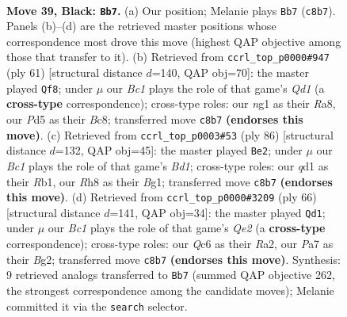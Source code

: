 \documentclass[11pt]{article}
\begin{document}
\clearpage

\begin{figure}[p]\centering
\begin{subfigure}{0.46\textwidth}\centering
\resizebox{\linewidth}{!}{%
\newchessgame
\chessboard[
  setfen={2b4r/p2r1k1p/n1qb2pP/1p1p1pP1/3P1P2/1P2P2K/4N3/R2Q1BNR b - - 25 39},
  showmover=false,
  pgfstyle=straightmove, color=movearrow, markmove={c8-b7}
]}
\caption{}
\end{subfigure}\hfill
\begin{subfigure}{0.46\textwidth}\centering
\resizebox{\linewidth}{!}{%
\newchessgame
\chessboard[
  setfen={r1bq3k/2p1b2r/3p2R1/pNnPp3/P1P1Pp1p/R4P1P/4BN2/6QK b - - 4 31},
  showmover=false,
  pgfstyle=straightmove, color=movearrow, markmove={d8-f8}
]}
\caption{}
\end{subfigure}
\\[4pt]
\begin{subfigure}{0.46\textwidth}\centering
\resizebox{\linewidth}{!}{%
\newchessgame
\chessboard[
  setfen={1qr3k1/1r1nppbp/p2p1np1/3P4/N1p1PP2/P4RPP/1PQ5/1R1B2BK w - - 1 44},
  showmover=false,
  pgfstyle=straightmove, color=movearrow, markmove={d1-e2}
]}
\caption{}
\end{subfigure}\hfill
\begin{subfigure}{0.46\textwidth}\centering
\resizebox{\linewidth}{!}{%
\newchessgame
\chessboard[
  setfen={6k1/2r1bpp1/1pq1nn1p/p2p4/P6P/1P2PNP1/R3QPB1/4B1K1 w - - 1 34},
  showmover=false,
  pgfstyle=straightmove, color=movearrow, markmove={e2-d1}
]}
\caption{}
\end{subfigure}
\caption{\textbf{Move 39, Black: \texttt{Bb7}.} (a) Our position; Melanie plays \texttt{Bb7} (\texttt{c8b7}). Panels (b)--(d) are the retrieved master positions whose correspondence most drove this move (highest QAP objective among those that transfer to it). (b) Retrieved from \texttt{ccrl\_top\_p0000\#947} (ply 61) [structural distance $d$=140, QAP obj=70]: the master played \texttt{Qf8}; under $\mu$ our \emph{Bc1} plays the role of that game's \emph{Qd1} (a \textbf{cross-type} correspondence); cross-type roles: our \emph{n}g1 as their \emph{R}a8, our \emph{P}d5 as their \emph{B}c8; transferred move \texttt{c8b7} \textbf{(endorses this move)}. (c) Retrieved from \texttt{ccrl\_top\_p0003\#53} (ply 86) [structural distance $d$=132, QAP obj=45]: the master played \texttt{Be2}; under $\mu$ our \emph{Bc1} plays the role of that game's \emph{Bd1}; cross-type roles: our \emph{q}d1 as their \emph{R}b1, our \emph{R}h8 as their \emph{B}g1; transferred move \texttt{c8b7} \textbf{(endorses this move)}. (d) Retrieved from \texttt{ccrl\_top\_p0000\#3209} (ply 66) [structural distance $d$=141, QAP obj=34]: the master played \texttt{Qd1}; under $\mu$ our \emph{Bc1} plays the role of that game's \emph{Qe2} (a \textbf{cross-type} correspondence); cross-type roles: our \emph{Q}c6 as their \emph{R}a2, our \emph{P}a7 as their \emph{B}g2; transferred move \texttt{c8b7} \textbf{(endorses this move)}. Synthesis: 9 retrieved analogs transferred to \texttt{Bb7} (summed QAP objective 262, the strongest correspondence among the candidate moves); Melanie committed it via the \texttt{search} selector.}
\label{fig:thought-m77}
\end{figure}
\end{document}
